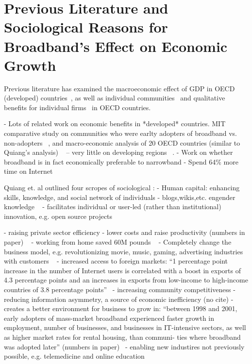 \section{Previous Literature and Sociological Reasons for Broadband's Effect on Economic Growth}
\label{sec:sociology}

Previous literature has examined the macroeconomic effect of GDP in OECD
(developed) countries~\cite{koutroumpis2009economic}, as well as individual
communities~\cite{gillett2006measuring} and
qualitative benefits for individual firms~\cite{varian2002net} in OECD
countries.

- Lots of related work on economic benefits in *developed* countries. MIT comparative study on communities who were earlty adopters of broadband vs. non-adopters ~\cite{gillett2006measuring}, and macro-economic analysis of 20 OECD countries (similar to Quiang’s analysis) ~\cite{koutroumpis2009economic} -- very little on developing regions ~\cite{Quiang}.
- Work on whether broadband is in fact economically preferable to narrowband
    - Spend 64\% more time on Internet ~\cite{saksena2003igniting}


Quiang et. al outlined four scropes of sociological : 
   - Human capital: enhancing skills, knowledge, and social network of individuals
       - blogs,wikis,etc. engender knowledge ~\cite{johnson2005next}
       - facilitates individual or user-led (rather than institutional) innovation, e.g. open source projects ~\cite{von2009democratizing}

   - raising private sector efficiency
       - lower costs and raise productivity (numbers in paper) ~\cite{varian2002net}
       - working from home saved 60M pounds ~\cite{bband_stakeholder}
       - Completely change the business model, e.g. revolutionizing movie, music, gaming, advertising industries with customers ~\cite{heng2006media}
       - increased access to foreign markets: ``1 percentage point increase in
       the number of Internet users is correlated with a boost in exports of
       4.3 percentage points and an increases in exports from low-income to
       high-income countries of 3.8 percentage points''~\cite{clarke2004has}
   - increasing community competitiveness
        - reducing information asymmetry, a source of economic inefficiency (no cite)
        - creates a better environment for business to grow in: ``between 1998
        and 2001, early adopters of mass-market broadband experienced faster
        growth in employment, number of businesses, and businesses in
        IT-intensive sectors, as well as higher market rates for rental
        housing, than communi- ties where broadband was adopted later'' (numbers in paper)~\cite{gillett2006measuring}
          - enabling new industires not previously possible, e.g. telemedicine and online education
 
